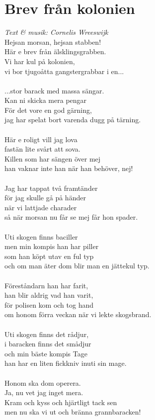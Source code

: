 \section{Brev från kolonien}
\textit{Text & musik: Cornelis Wreeswijk}
\vspace{2mm}\\
Hejsan morsan, hejsan stabben!\\
Här e brev från älsklingsgrabben.\\
Vi har kul på kolonien,\\
vi bor tjugoåtta gangstergrabbar i en...\\
\\
...stor barack med massa sängar.\\
Kan ni skicka mera pengar\\
För det vore en god gärning,\\
jag har spelat bort varenda dugg på tärning.\\
\\
Här e roligt vill jag lova\\
fastän lite svårt att sova.\\
Killen som har sängen över mej\\
han vaknar inte han när han behöver, nej!\\
\\
Jag har tappat två framtänder\\
för jag skulle gå på händer\\
när vi lattjade charader\\
så när morsan nu får se mej får hon spader.\\
\\
Uti skogen finns baciller\\
men min kompis han har piller\\
som han köpt utav en ful typ\\
och om man äter dom blir man en jättekul typ.\\
\\
Föreståndarn han har farit,\\
han blir aldrig vad han varit,\\
för polisen kom och tog hand\\
om honom förra veckan när vi lekte skogsbrand.\\
\\
Uti skogen finns det rådjur,\\
i baracken finns det smådjur\\
och min bäste kompis Tage\\
han har en liten fickkniv inuti sin mage.\\
\\
Honom ska dom operera.\\
Ja, nu vet jag inget mera.\\
Kram och kyss och hjärtligt tack sen\\
men nu ska vi ut och bränna grannbaracken!

